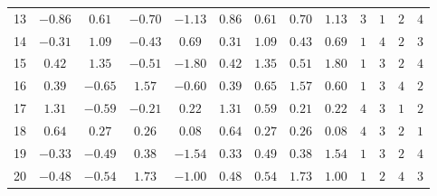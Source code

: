 \begin{table}[!ht]
\begin{tabular}{@{}ccccccccccccc@{}}
		13 & \(-0.86\) & \(0.61\) & \(-0.70\) & \(-1.13\) & \(0.86\) & \(0.61\) & \(0.70\) & \(1.13\) & \(3\) & \(1\) & \(2\) & \(4\) \\
		14 & \(-0.31\) & \(1.09\) & \(-0.43\) & \(0.69\) & \(0.31\) & \(1.09\) & \(0.43\) & \(0.69\) & \(1\) & \(4\) & \(2\) & \(3\) \\
		15 & \(0.42\) & \(1.35\) & \(-0.51\) & \(-1.80\) & \(0.42\) & \(1.35\) & \(0.51\) & \(1.80\) & \(1\) & \(3\) & \(2\) & \(4\) \\
		16 & \(0.39\) & \(-0.65\) & \(1.57\) & \(-0.60\) & \(0.39\) & \(0.65\) & \(1.57\) & \(0.60\) & \(1\) & \(3\) & \(4\) & \(2\) \\
		17 & \(1.31\) & \(-0.59\) & \(-0.21\) & \(0.22\) & \(1.31\) & \(0.59\) & \(0.21\) & \(0.22\) & \(4\) & \(3\) & \(1\) & \(2\) \\
		18 & \(0.64\) & \(0.27\) & \(0.26\) & \(0.08\) & \(0.64\) & \(0.27\) & \(0.26\) & \(0.08\) & \(4\) & \(3\) & \(2\) & \(1\) \\
		19 & \(-0.33\) & \(-0.49\) & \(0.38\) & \(-1.54\) & \(0.33\) & \(0.49\) & \(0.38\) & \(1.54\) & \(1\) & \(3\) & \(2\) & \(4\) \\
		20 & \(-0.48\) & \(-0.54\) & \(1.73\) & \(-1.00\) & \(0.48\) & \(0.54\) & \(1.73\) & \(1.00\) & \(1\) & \(2\) & \(4\) & \(3\) \\ \bottomrule
	\end{tabular}
\end{table}

